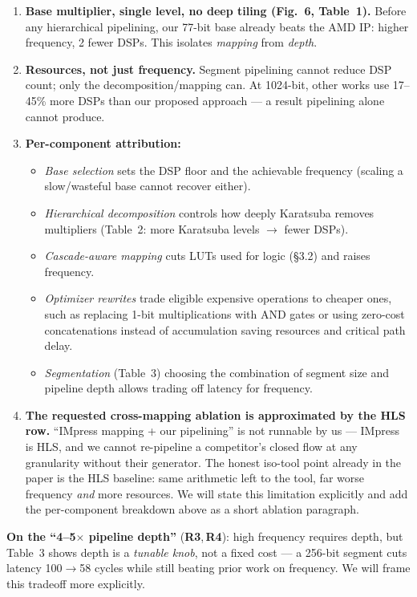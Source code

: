 \documentclass[10pt]{article}
\newcommand{\Rc}{\textbf{\textcolor{c3}{R3}}}
\newcommand{\Rd}{\textbf{\textcolor{c4}{R4}}}
\begin{document}
\begin{enumerate}
\item \textbf{Base multiplier, single level, no deep tiling (Fig.~6, Table~1).}
Before any hierarchical pipelining, our 77-bit base already beats the AMD IP: higher frequency, 2 fewer DSPs.
This isolates \emph{mapping} from \emph{depth}.
\item \textbf{Resources, not just frequency.}
Segment pipelining cannot reduce DSP count; only the decomposition/mapping can.
At 1024-bit, other works use 17--45\% more DSPs than our proposed approach --- a result pipelining alone cannot produce.
\item \textbf{Per-component attribution:}
\begin{itemize}
\item \emph{Base selection} sets the DSP floor and the achievable frequency (scaling a slow/wasteful base cannot recover either).
\item \emph{Hierarchical decomposition} controls how deeply Karatsuba removes multipliers (Table~2: more Karatsuba levels $\to$ fewer DSPs).
\item \emph{Cascade-aware mapping} cuts LUTs used for logic (\S3.2) and raises frequency.
\item \emph{Optimizer rewrites} trade eligible expensive operations to cheaper ones, such as replacing 1-bit multiplications with AND gates or using zero-cost concatenations instead of accumulation saving resources and critical path delay.
\item \emph{Segmentation} (Table~3) choosing the combination of segment size and pipeline depth allows trading off latency for frequency.
\end{itemize}
\item \textbf{The requested cross-mapping ablation is approximated by the HLS row.}
``IMpress mapping + our pipelining'' is not runnable by us --- IMpress is HLS, and we cannot re-pipeline a competitor's closed flow at any granularity without their generator.
The honest iso-tool point already in the paper is the HLS baseline: same arithmetic left to the tool, far worse frequency \emph{and} more resources.
We will state this limitation explicitly and add the per-component breakdown above as a short ablation paragraph.
\end{enumerate}
\textbf{On the ``4--5$\times$ pipeline depth''} (\Rc,\,\Rd): high frequency requires depth, but Table~3 shows depth is a \emph{tunable knob}, not a fixed cost --- a 256-bit segment cuts latency 100$\to$58 cycles while still beating prior work on frequency.
We will frame this tradeoff more explicitly.
\end{document}
